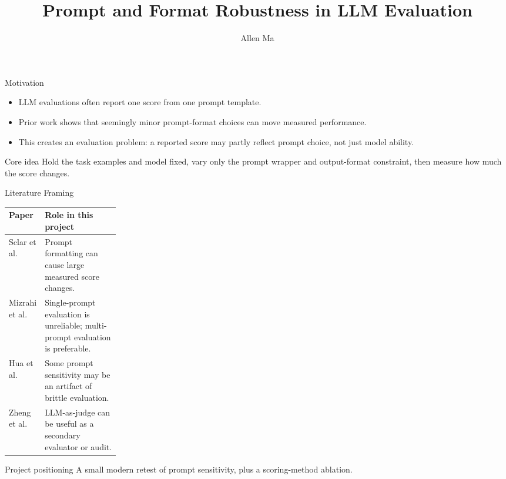 \documentclass[aspectratio=169,11pt]{beamer}
\title{Prompt and Format Robustness in LLM Evaluation}
\author{Allen Ma}
\institute{
M.S. Computer Science, UCLA\\
Capstone Advisor: Kai-Wei Chang
}
\date{}
\newcommand{\smallgap}{\vspace{0.35em}}
\begin{document}
\begin{frame}
  \titlepage
\end{frame}

\begin{frame}{Motivation}
  \begin{itemize}
    \item LLM evaluations often report one score from one prompt template.
    \item Prior work shows that seemingly minor prompt-format choices can move measured performance.
    \item This creates an evaluation problem: a reported score may partly reflect prompt choice, not just model ability.
  \end{itemize}

  \smallgap
  \begin{block}{Core idea}
    Hold the task examples and model fixed, vary only the prompt wrapper and output-format constraint, then measure how much the score changes.
  \end{block}
\end{frame}

\begin{frame}{Literature Framing}
  \begin{tabularx}{\linewidth}{>{\raggedright\arraybackslash}p{0.22\linewidth} X}
    \toprule
    Paper & Role in this project \\
    \midrule
    Sclar et al. & Prompt formatting can cause large measured score changes. \\
    Mizrahi et al. & Single-prompt evaluation is unreliable; multi-prompt evaluation is preferable. \\
    Hua et al. & Some prompt sensitivity may be an artifact of brittle evaluation. \\
    Zheng et al. & LLM-as-judge can be useful as a secondary evaluator or audit. \\
    \bottomrule
  \end{tabularx}

  \smallgap
  \begin{block}{Project positioning}
    A small modern retest of prompt sensitivity, plus a scoring-method ablation.
  \end{block}
\end{frame}
\end{document}
